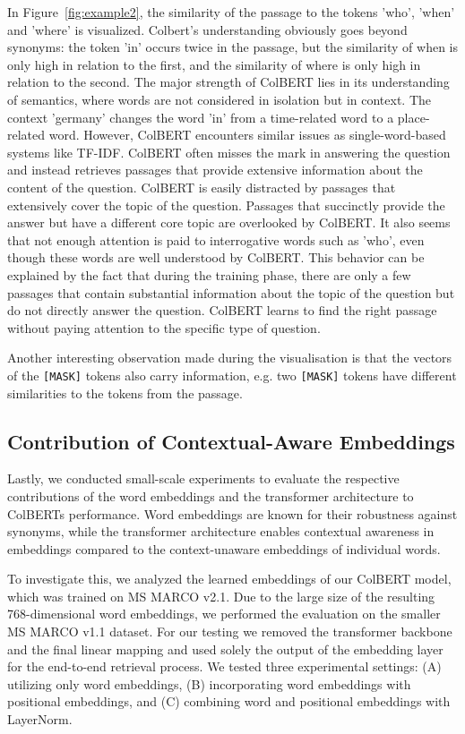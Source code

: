 \documentclass[11pt]{article}
\begin{document}
In Figure~\ref{fig:example2}, the similarity of the passage to the tokens 'who', 'when' and 'where' is visualized. 
Colbert's understanding obviously goes beyond synonyms: the token 'in' occurs twice in the passage, but the similarity of when is only high in relation to the first, and the similarity of where is only high in relation to the second. 
The major strength of ColBERT lies in its understanding of semantics, where words are not considered in isolation but in context. 
The context 'germany' changes the word 'in' from a time-related word to a place-related word.
However, ColBERT encounters similar issues as single-word-based systems like TF-IDF. 
ColBERT often misses the mark in answering the question and instead retrieves passages that provide extensive information about the content of the question. ColBERT is easily distracted by passages that extensively cover the topic of the question. Passages that succinctly provide the answer but have a different core topic are overlooked by ColBERT. 
It also seems that not enough attention is paid to interrogative words such as 'who', even though these words are well understood by ColBERT.
This behavior can be explained by the fact that during the training phase, there are only a few passages that contain substantial information about the topic of the question but do not directly answer the question.
ColBERT learns to find the right passage without paying attention to the specific type of question.

Another interesting observation made during the visualisation is that the vectors of the \texttt{[MASK]} tokens also carry information, e.g. two \texttt{[MASK]} tokens have different similarities to the tokens from the passage. 

\subsection{Contribution of Contextual-Aware Embeddings}
Lastly, we conducted small-scale experiments to evaluate the respective contributions of the word embeddings and the transformer architecture to ColBERTs performance. Word embeddings are known for their robustness against synonyms, while the transformer architecture enables contextual awareness in embeddings compared to the context-unaware embeddings of individual words.

To investigate this, we analyzed the learned embeddings of our ColBERT model, which was trained on MS MARCO v2.1. Due to the large size of the resulting 768-dimensional word embeddings, we performed the evaluation on the smaller MS MARCO v1.1 dataset. For our testing we removed the transformer backbone and the final linear mapping and used solely the output of the embedding layer for the end-to-end retrieval process. We tested three experimental settings: (A) utilizing only word embeddings, (B) incorporating word embeddings with positional embeddings, and (C) combining word and positional embeddings with LayerNorm.
\end{document}
